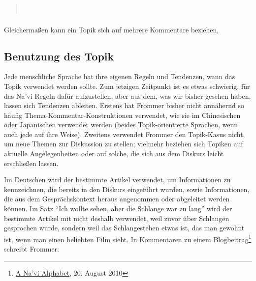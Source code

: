 \begin{quotation}
\noindent{}\\
\indent{}
\end{quotation}

\subsubsection{} Gleichermaßen kann ein Topik sich auf mehrere Kommentare beziehen, 

\begin{quotation}
\noindent{}

\end{quotation}

\subsection{Benutzung des Topik}
Jede menschliche Sprache hat ihre eigenen Regeln und Tendenzen, wann das Topik verwendet werden sollte. Zum jetzigen Zeitpunkt ist es etwas schwierig, für das Na'vi Regeln dafür aufzustellen, aber aus dem, was wir bisher gesehen haben, lassen sich Tendenzen ableiten. Erstens hat Frommer bisher nicht annähernd so häufig Thema-Kommentar-Konstruktionen verwendet, wie sie im Chinesischen oder Japanischen verwendet werden (beides Topik-orientierte Sprachen, wenn auch jede auf ihre Weise). Zweitens verwendet Frommer den Topik-Kasus nicht, um neue Themen zur Diskussion zu stellen; vielmehr beziehen sich Topiken auf aktuelle Angelegenheiten oder auf solche, die sich aus dem Diskurs leicht erschließen lassen.

Im Deutschen wird der bestimmte Artikel  verwendet, um Informationen zu kennzeichnen, die bereits in den Diskurs eingeführt wurden, sowie Informationen, die aus dem Gesprächskontext heraus angenommen oder abgeleitet werden können. Im Satz ``Ich wollte  sehen, aber die Schlange war zu lang'' wird der bestimmte Artikel mit  nicht deshalb verwendet, weil zuvor über Schlangen gesprochen wurde, sondern weil das Schlangestehen etwas ist, das man gewohnt ist, wenn man einen beliebten Film sieht. In Kommentaren zu einem Blogbeitrag\footnote{\href{https://naviteri.org/2010/08/20/}{A Na'vi Alphabet}, 20. August 2010} schreibt Frommer: 

